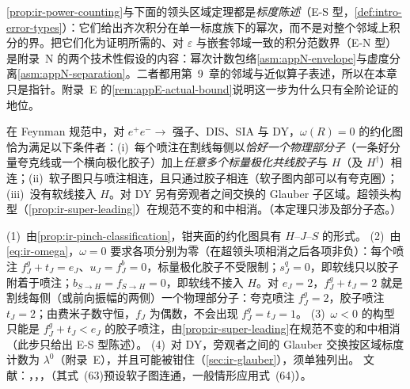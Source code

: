 \begin{remark}[标度陈述与积分界]\label{rem:ir-scaling-vs-bound}
\cref{prop:ir-power-counting}与下面的领头区域定理都是\emph{标度陈述}（E-S 型，\cref{def:intro-error-types}）：它们给出齐次积分在单一标度族下的幂次，而不是对整个邻域上积分的界。把它们化为证明所需的、对 $\varepsilon$ 与嵌套邻域一致的积分范数界（E-N 型）是附录~N 的两个技术性假设的内容：幂次计数包络\cref{asm:appN-envelope}与虚度分离\cref{asm:appN-separation}。二者都用第~9~章的邻域与近似算子表述，所以在本章只是指针。附录~E 的\cref{rem:appE-actual-bound}说明这一步为什么只有全阶论证的地位。
\end{remark}

\begin{theorem}\label{thm:ir-leading-regions}
在 Feynman 规范中，对 $e^+e^-\to$ 强子、DIS、SIA 与 DY，$\omega(R)=0$ 的约化图恰为满足以下条件者：(i)~每个喷注在割线每侧以\emph{恰好一个物理部分子}（一条好分量夸克线或一个横向极化胶子）加上\emph{任意多个标量极化共线胶子}与 $H$（及 $H^\dagger$）相连；(ii)~软子图只与喷注相连，且只通过胶子相连（软子图内部可以有夸克圈）；(iii)~没有软线接入 $H$。对 DY 另有旁观者之间交换的 Glauber 子区域。超领头构型（\cref{prop:ir-super-leading}）在规范不变的和中相消。（本定理只涉及部分子态。）
\end{theorem}
\begin{proofsketch}
(1)~由\cref{prop:ir-pinch-classification}，钳夹面的约化图具有 $H$--$J$--$S$ 的形式。
(2)~由\cref{eq:ir-omega}，$\omega=0$ 要求各项分别为零（在超领头项相消之后各项非负）：每个喷注 $f^g_J+t_J=e_J$、$u_J=f^b_J=0$，标量极化胶子不受限制；$s^q_J=0$，即软线只以胶子附着于喷注；$b_{S\to H}=f_{S\to H}=0$，即软线不接入 $H$。对 $e_J=2$，$f^g_J+t_J=2$ 就是割线每侧（或前向振幅的两侧）一个物理部分子：夸克喷注 $f^g_J=2$，胶子喷注 $t_J=2$；由费米子数守恒，$f_J$ 为偶数，不会出现 $f^g_J=t_J=1$。
(3)~$\omega<0$ 的构型只能是 $f^g_J+t_J<e_J$ 的胶子喷注，由\cref{prop:ir-super-leading}在规范不变的和中相消（此步只给出 E-S 型陈述）。
(4)~对 DY，旁观者之间的 Glauber 交换按区域标度计数为 $\lambda^0$（附录~E），并且可能被钳住（\cref{sec:ir-glauber}），须单独列出。
文献：\cite{Sterman1978a,LibbySterman1978a,LibbySterman1978b}，\cite[第~5.8--5.11~节；领头区域规则见第~5.9.2~节与式~(5.75)--(5.79)]{Collins2011}，\cite[第~8.7~节]{CollinsSoperSterman1989}，\cite[第~2.3--2.4~节，式~(60)--(69)]{Sterman:1995fz}（其式~(63)预设软子图连通，一般情形应用式~(64)）。
\end{proofsketch}

